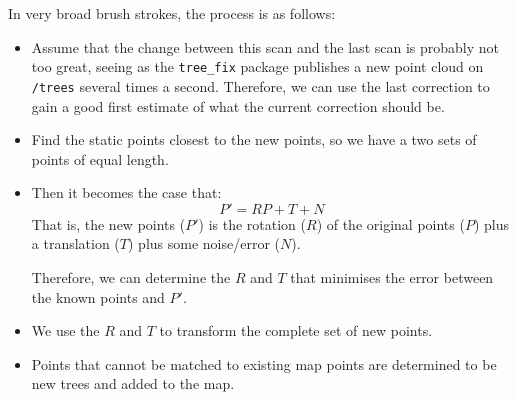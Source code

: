 \documentclass[12pt,oneside,a4paper]{book}
\begin{document}
In very broad brush strokes, the process is as follows:
\begin{itemize}
\item Assume that the change between this scan and the last scan is
  probably not too great, seeing as the \texttt{tree\_fix} package
  publishes a new point cloud on \texttt{/trees} several times a
  second. Therefore, we can use the last correction to gain a good
  first estimate of what the current correction should be.
\item Find the static points closest to the new points, so we have a
  two sets of points of equal length. 
\item Then it becomes the case that:
  \begin{equation}
    \label{eq:1}
    P' = RP + T + N
  \end{equation}
  That is, the new points ($P'$) is the rotation ($R$) of the original
  points ($P$) plus a translation ($T$) plus some noise/error ($N$).

  Therefore, we can determine the $R$ and $T$ that minimises the error
  between the known points and $P'$.
\item We use the $R$ and $T$ to transform the complete set of new
  points. 
\item Points that cannot be matched to existing map points are
  determined to be new trees and added to the map.
\end{itemize}
\end{document}
